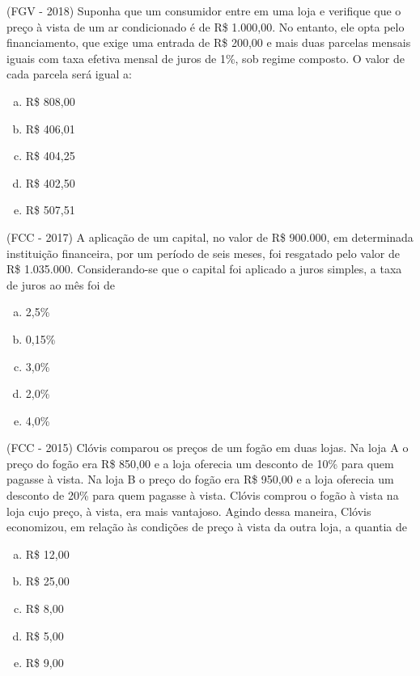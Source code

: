  \begin{exer}
  (FGV - 2018) Suponha que um consumidor entre em uma loja e verifique que o preço à vista de um ar condicionado é de R\$ 1.000,00. No entanto, ele opta pelo financiamento, que exige uma entrada de R\$ 200,00 e mais duas parcelas mensais iguais com taxa efetiva mensal de juros de 1\%, sob regime composto. O valor de cada parcela será igual a:
  \begin{enumerate}[a)]
  \item R\$ 808,00
  \item R\$ 406,01
  \item R\$ 404,25
  \item R\$ 402,50
  \item R\$ 507,51
  \end{enumerate}
  \end{exer}

  \begin{exer}
  (FCC - 2017) A aplicação de um capital, no valor de R\$ 900.000, em determinada instituição financeira, por um período de seis meses, foi resgatado pelo valor de R\$ 1.035.000. Considerando-se que o capital foi aplicado a juros simples, a taxa de juros ao mês foi de
  \begin{enumerate}[a)]
  \item 2,5\%
  \item 0,15\%
  \item 3,0\%
  \item 2,0\%
  \item 4,0\%
  \end{enumerate}
  \end{exer}

  \begin{exer}
  (FCC - 2015) Clóvis comparou os preços de um fogão em duas lojas. Na loja A o preço do fogão era R\$ 850,00 e a loja oferecia um desconto de 10\% para quem pagasse à vista. Na loja B o preço do fogão era R\$ 950,00 e a loja oferecia um desconto de 20\% para quem pagasse à vista. Clóvis comprou o fogão à vista na loja cujo preço, à vista, era mais vantajoso. Agindo dessa maneira, Clóvis economizou, em relação às condições de preço à vista da outra loja, a quantia de
  \begin{enumerate}[a)]
  \item R\$ 12,00
  \item R\$ 25,00
  \item R\$ 8,00
  \item R\$ 5,00
  \item R\$ 9,00
  \end{enumerate}
  \end{exer}

